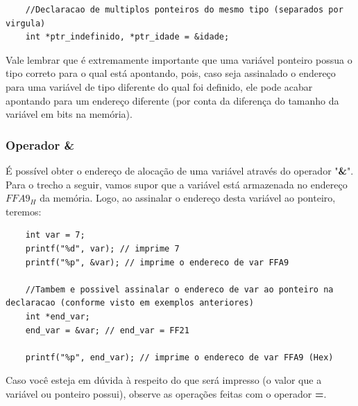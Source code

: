 \documentclass[12pt]{article}
\newcommand\tab[1][1cm]{\hspace*{#1}}
\begin{document}
\hspace{0.25cm}
\begin{lstlisting}
    //Declaracao de multiplos ponteiros do mesmo tipo (separados por virgula)
    int *ptr_indefinido, *ptr_idade = &idade;
\end{lstlisting}

\hspace{0.25cm}
\begin{tcolorbox}[colback=red!5!white,colframe=red!75!black,title=Cuidado!]
  \par\tab Vale lembrar que é extremamente importante que uma variável ponteiro possua o tipo correto para o qual está apontando, pois, caso seja assinalado o endereço para uma variável de tipo diferente do qual foi definido, ele pode acabar apontando para um endereço diferente (por conta da diferença do tamanho da variável em bits na memória).
\end{tcolorbox}

\subsubsection{Operador \&}

\par\tab É possível obter o endereço de alocação de uma variável através do operador "\textbf{\&}". Para o trecho a seguir, vamos supor que a variável está armazenada no endereço \textit{$FFA9_H$} da memória. Logo, ao assinalar o endereço desta variável ao ponteiro, teremos:

\hspace{0.25cm}
\begin{lstlisting}
    int var = 7;
    printf("%d", var); // imprime 7
    printf("%p", &var); // imprime o endereco de var FFA9
    
    //Tambem e possivel assinalar o endereco de var ao ponteiro na declaracao (conforme visto em exemplos anteriores)
    int *end_var;
    end_var = &var; // end_var = FF21
    
    printf("%p", end_var); // imprime o endereco de var FFA9 (Hex)
\end{lstlisting}

\hspace{0.25cm}
\begin{tcolorbox}[colback=blue!5!white,colframe=blue!75!black,title=Dica!]
  \par\tab Caso você esteja em dúvida à respeito do que será impresso (o valor que a variável ou ponteiro possui), observe as operações feitas com o operador \textbf{=}.
\end{tcolorbox}
\end{document}
